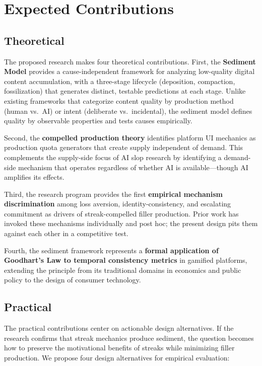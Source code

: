 \documentclass[12pt]{article}
\begin{document}
\section{Expected Contributions}
\label{sec:contributions}

\subsection{Theoretical}
\label{sec:contributions-theoretical}

The proposed research makes four theoretical contributions. First, the \textbf{Sediment Model} provides a cause-independent framework for analyzing low-quality digital content accumulation, with a three-stage lifecycle (deposition, compaction, fossilization) that generates distinct, testable predictions at each stage. Unlike existing frameworks that categorize content quality by production method (human vs.\ AI) or intent (deliberate vs.\ incidental), the sediment model defines quality by observable properties and tests causes empirically.

Second, the \textbf{compelled production theory} identifies platform UI mechanics as production quota generators that create supply independent of demand. This complements the supply-side focus of AI slop research by identifying a demand-side mechanism that operates regardless of whether AI is available---though AI amplifies its effects.

Third, the research program provides the first \textbf{empirical mechanism discrimination} among loss aversion, identity-consistency, and escalating commitment as drivers of streak-compelled filler production. Prior work has invoked these mechanisms individually and post hoc; the present design pits them against each other in a competitive test.

Fourth, the sediment framework represents a \textbf{formal application of Goodhart's Law to temporal consistency metrics} in gamified platforms, extending the principle from its traditional domains in economics and public policy to the design of consumer technology.

\subsection{Practical}
\label{sec:contributions-practical}

The practical contributions center on actionable design alternatives. If the research confirms that streak mechanics produce sediment, the question becomes how to preserve the motivational benefits of streaks while minimizing filler production. We propose four design alternatives for empirical evaluation:
\end{document}

